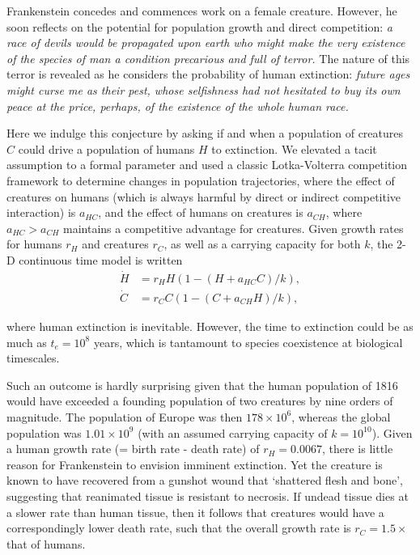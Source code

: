 \documentclass{article}[10pt]
\begin{document}
Frankenstein concedes and commences work on a female creature. 
However, he soon reflects on the potential for population growth and direct competition: \emph{a race of devils would be propagated upon earth who might make the very existence of the species of man a condition precarious and full of terror.}
The nature of this terror is revealed as he considers the probability of human extinction: \emph{future ages might curse me as their pest, whose selfishness had not hesitated to buy its own peace at the price, perhaps, of the existence of the whole human race.}


Here we indulge this conjecture by asking if and when a population of creatures $C$ could drive a population of humans $H$ to extinction.
We elevated a tacit assumption to a formal parameter  and used a classic Lotka-Volterra competition framework to determine changes in population trajectories, where the effect of creatures on humans (which is always harmful by direct or indirect competitive interaction) is $a_{HC}$, and the effect of humans on creatures is $a_{CH}$, where $a_{HC} > a_{CH}$ maintains a competitive advantage for creatures.
Given growth rates for humans $r_H$ and creatures $r_C$, as well as a carrying capacity for both $k$, the 2-D continuous time model is written
\vspace{-1mm}
\begin{align}
\dot{H}&=r_H H\left(1 - (H + a_{HC} C)/k\right), \\ \nonumber	
\dot{C}&=r_C C\left(1 - (C + a_{CH} H)/k\right),
\end{align}

\noindent where human extinction is inevitable.
However, the time to extinction could be as much as $t_e=10^8$ years, which is tantamount to species coexistence at biological timescales.

Such an outcome is hardly surprising given that the human population of 1816 would have exceeded a founding population of two creatures by nine orders of magnitude.
The population of Europe was then $178\times 10^6$, whereas the global population was $1.01\times 10^9$ (with an assumed carrying capacity of $k=10^{10}$).
Given a human growth rate (= birth rate - death rate) of $r_H=0.0067$, there is little reason for Frankenstein to envision imminent extinction. 
Yet the creature is known to have recovered from a gunshot wound that `shattered flesh and bone', suggesting that reanimated tissue is resistant to necrosis. 
If undead tissue dies at a slower rate than human tissue, then it follows that creatures would have a correspondingly lower death rate, such that the overall growth rate is $r_C=1.5\times$ that of humans.
\end{document}
